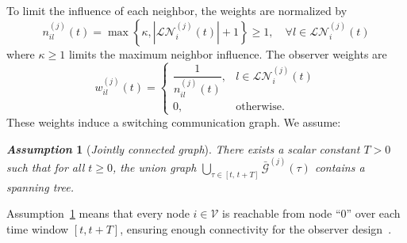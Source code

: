 \documentclass{ifacconf}
\def\eqref#1{(\ref{#1})}
\def\V{\mathcal{V}} %
\def\G{\mathcal{G}} %
\def\LT{\mathcal{LT}} %
\newtheorem{assumption}{\it \textbf{Assumption}}%
\begin{document}
To limit the influence of each neighbor, the weights are normalized by
\begin{equation}\label{new_setneibor}
n_{il}^{(j)}(t)=\max \left\{\kappa,\left|\mathcal{LN}_i^{(j)}(t)\right|+1\right\} \geq 1, \quad \forall l\in \mathcal{LN}_i^{(j)}(t)
\end{equation}
where $\kappa \geq 1$ limits the maximum neighbor influence. 
The observer weights are
\begin{equation}\label{design_gain}
    w_{il}^{(j)}(t) = \begin{cases}
        \dfrac{1}{n_{il}^{(j)}(t)}, & l \in \mathcal{LN}_i^{(j)}(t)\\
        0 ,& \text{otherwise}.
    \end{cases}
\end{equation}
%
These weights induce a switching communication graph. We assume:
\begin{assumption}[\it Jointly connected graph]%
\label{ass_graph}
There exists a scalar constant $T > 0$ such that for all $t\geq 0$, the union graph $\bigcup_{\tau\in[t,\,t+T]}\bar{\G}^{(j)}(\tau)$ contains a spanning tree.
\end{assumption}
Assumption~\ref{ass_graph} means that every node $i \in\V$ is reachable from node ``0'' over each time window $[t,t+T]$, ensuring enough connectivity for the observer design~\cite{hao2024eventtriggered}.


\vspace*{-0.1cm}
\end{document}
